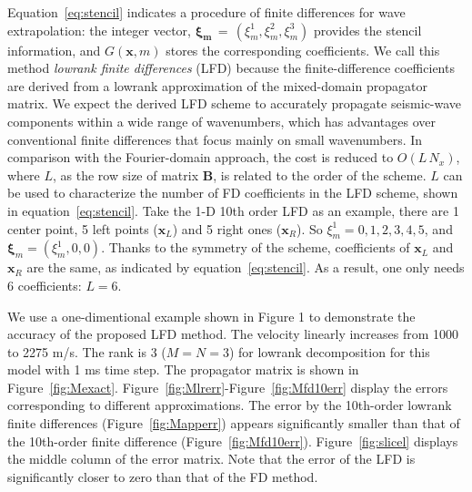 Equation~\ref{eq:stencil} indicates a procedure of finite differences for wave extrapolation: the integer vector, $\mathbf{\mathbf{\xi}_m}\,=\,(\xi_m^1,\xi_m^2,\xi_m^3)$ provides the stencil information, and $G(\mathbf{x},m)$ stores the corresponding coefficients.
We call this method \emph{lowrank finite differences} (LFD) 
because the finite-difference coefficients are derived from a lowrank approximation of the mixed-domain propagator matrix.
We expect the derived LFD scheme to accurately propagate seismic-wave components within a wide range of wavenumbers, 
which has advantages over conventional finite differences that focus mainly on small wavenumbers. 
In comparison with the Fourier-domain approach, the cost is reduced to $O(L\,N_x)$, 
where $L$, as the row size of matrix $\mathbf{B}$, is related to the order of the scheme. 
$L$ can be used to characterize the number of FD coefficients in the LFD scheme, shown in equation~\ref{eq:stencil}. 
Take the 1-D 10th order LFD as an example, there are 1 center point, 5 left points ($\mathbf{x}_L$) and 5 right ones ($\mathbf{x}_R$).
So $\xi_m^1={0,1,2,3,4,5}$, and $\mathbf{\xi}_m=(\xi_m^1,0,0)$.
Thanks to the symmetry of the scheme, 
coefficients of $\mathbf{x}_L$ and $\mathbf{x}_R$ are the same, as indicated by equation~\ref{eq:stencil}.
As a result, one only needs 6 coefficients: $L=6$. 


We use a one-dimentional example shown in Figure 1 to demonstrate the accuracy of the proposed LFD method. 
The velocity linearly increases from 1000 to 2275 m/s. 
The rank is 3 ($M=N=3$) for lowrank decomposition for this model with 1 ms time step. 
The propagator matrix is shown in Figure~\ref{fig:Mexact}.
Figure~\ref{fig:Mlrerr}-Figure~\ref{fig:Mfd10err} display the errors corresponding to different approximations.
The error by the 10th-order lowrank finite differences (Figure~\ref{fig:Mapperr}) appears significantly smaller than that of the 10th-order finite difference (Figure~\ref{fig:Mfd10err}).
Figure~\ref{fig:slicel} displays the middle column of the error matrix. Note that the error of the LFD is significantly closer to zero than that of the FD method. 



